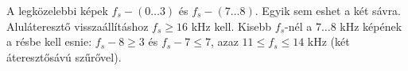 A legközelebbi képek $f_s-(0\ldots3)$ és $f_s-(7\ldots8)$. Egyik sem eshet a két sávra. Aluláteresztő visszaállításhoz $f_s\ge16$ kHz kell. Kisebb $f_s$-nél a $7\ldots8$ kHz képének a résbe kell esnie: $f_s-8\ge3$ és $f_s-7\le7$, azaz $11\le f_s\le14$ kHz (két áteresztősávú szűrővel).



\begin{center}\end{center}

\begin{center}\end{center}

\begin{center}\end{center}

\begin{center}\end{center}
\begin{eredmeny}

\begin{center}\end{center}
\end{eredmeny}


